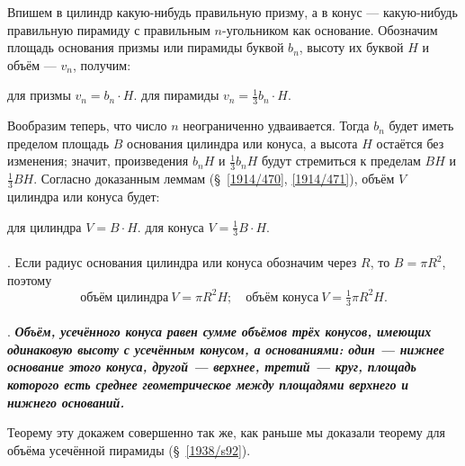 Впишем в цилиндр какую-нибудь правильную призму, а в конус — какую-нибудь правильную пирамиду с правильным $n$-угольником как основание.
Обозначим площадь основания призмы или пирамиды буквой $b_n$, высоту их буквой $H$ и объём — $v_n$, получим:

\medskip

\setlength{\columnseprule}{.2pt}
\begin{paracol}{2}
для призмы $v_n = b_n\cdot H.$
\switchcolumn
для пирамиды $v_n= \tfrac13 b_n\cdot H.$
\end{paracol}

\medskip

Вообразим теперь, что число $n$ неограниченно удваивается.
Тогда $b_n$ будет иметь пределом площадь $B$ основания цилиндра или конуса, а высота $H$ остаётся без изменения;
значит, произведения $b_nH$ и $\tfrac13b_nH$ будут стремиться к пределам $BH$ и $\tfrac13BH$.
Согласно доказанным леммам (§~\ref{1914/470}, \ref{1914/471}), объём $V$ цилиндра или конуса будет:

\medskip

\setlength{\columnseprule}{.2pt}
\begin{paracol}{2}
для цилиндра $V = B\cdot  H$.
\switchcolumn
для конуса $V= \tfrac13 B\cdot  H$.
\end{paracol}

\medskip

\paragraph{}\label{1938/s121}
.
Если радиус основания цилиндра или конуса обозначим через $R$, то $B= \pi R^2$, поэтому 
\[
\text{объём цилиндра}\ V = \pi R^2H;
\quad
\text{объём конуса}\ V = \tfrac13\pi R^2H.\]

\paragraph{}\label{1938/s122}
.
\textbf{\emph{Объём, усечённого конуса равен сумме объёмов трёх конусов, имеющих одинаковую высоту с усечённым конусом, а основаниями: один — нижнее основание этого конуса, другой — верхнее, третий — круг, площадь которого есть среднее геометрическое между площадями верхнего и нижнего оснований.}}

Теорему эту докажем совершенно так же, как раньше мы доказали теорему для объёма усечённой пирамиды (§~\ref{1938/s92}).

